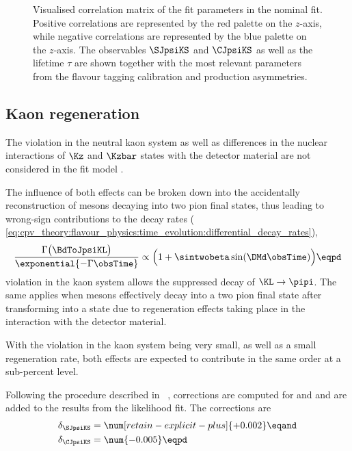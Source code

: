 %
\begin{figure}
\centering
  
  \caption{Visualised correlation matrix of the fit parameters in
    the nominal fit. Positive correlations are represented by the red palette on
    the $z$-axis, while negative correlations are represented by the blue
    palette on the $z$-axis. The \CP observables $\SJpsiKS$ and $\CJpsiKS$ as
    well as the \Bd lifetime $\tau$ are shown together with the most relevant
    parameters from the flavour tagging calibration and production asymmetries.}
  \label{fig:measurement_of_sin2beta:cpv_measurement:results:plots:correlation_matrix}
\end{figure}

\FloatBarrier
\subsection{Kaon regeneration}
\label{sec:measurement_of_sin2beta:cpv_measurement:kaon_regeneration}

The \CP violation in the neutral kaon system as well as differences in the
nuclear interactions of $\Kz$ and $\Kzbar$ states with the detector material are
not considered in the fit model \cite{set:kaonregeneration}.

The influence of both effects can be broken down into the accidentally
reconstruction of \KL mesons decaying into two pion final states, thus
leading to wrong-sign contributions to the decay rates (\cf
\cref{eq:cpv_theory:flavour_physics:time_evolution:differential_decay_rates}),
%
\begin{equation}
    \frac{\Gamma \bigl(\BdToJpsiKL\bigr)}{\exponential{-\Gamma \obsTime}} \propto \Bigl( 1 + \sintwobeta \sin(\DMd \obsTime) \Bigr) \eqpd
\end{equation}
%
\CP violation in the kaon system allows the suppressed decay of $\KL\to\pipi$.
The same applies when \KL mesons effectively decay into a two pion final state
after transforming into a \KS state due to regeneration effects taking place in
the interaction with the detector material. 

With the \CP violation in the kaon system being very small, as well as a small
regeneration rate, both effects are expected to contribute in the same order
at a sub-percent level.

Following the procedure described in \Ref~\cite{Aaij:2014gsa}, corrections are
computed for \SJpsiKS and \CJpsiKS and are added to the results from the
likelihood fit. The corrections are
%
\begin{equation}
  \begin{split}
    \delta_{\SJpsiKS} &= \num[retain-explicit-plus]{+0.002} \eqand\\
    \delta_{\CJpsiKS} &= \num{-0.005} \eqpd
  \end{split}
\end{equation}
